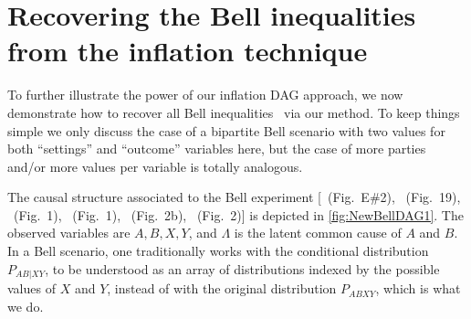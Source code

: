 \documentclass[aps,english,superscriptaddress,onecolumn,twoside,longbibliography,pra,floatfix,fleqn,nofootinbib]{revtex4-1}%
\theoremstyle{definition}
\begin{document}
\section{Recovering the Bell inequalities from the inflation technique}
\label{sec:Bellscenarios}


To further illustrate the power of our inflation DAG approach, we now demonstrate how to recover all Bell inequalities~\cite{Brunner2013Bell,bell1966lhvm,CHSHOriginal} via our method. To keep things simple we only discuss the case of a bipartite Bell scenario with two values for both ``settings'' and ``outcome'' variables here, but the case of more parties and/or more values per variable is totally analogous.

The causal structure associated to the Bell \cite{bell1964einstein,Brunner2013Bell,bell1966lhvm,CHSHOriginal} experiment [\citealp{pusey2014gdag}~(Fig.~E\#2), \citealp{WoodSpekkens}~(Fig.~19), \citealp{chaves2014novel}~(Fig.~1), \citealp{BeyondBellII}~(Fig.~1), \citealp{wolfe2015nonconvexity}~(Fig.~2b), \citealp{steeg2011relaxation}~(Fig.~2)] is depicted in \cref{fig:NewBellDAG1}. The observed variables are $A,B,X,Y$, and $\Lambda$ is the latent common cause of $A$ and $B$. In a Bell scenario, one traditionally works with the conditional distribution $P_{AB|XY}$, to be understood as an array of distributions indexed by the possible values of $X$ and $Y$, instead of with the original distribution $P_{ABXY}$, which is what we do.
\end{document}
